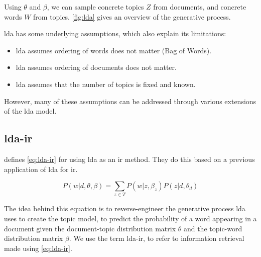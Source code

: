 Using $\theta$ and $\beta$, we can sample concrete topics $Z$ from documents, and concrete words $W$ from topics.
\autoref{fig:lda} gives an overview of the generative process.

\Gls{lda} has some underlying assumptions, which also explain its limitations\cite{blei2012topicmodels}:
\begin{itemize}
	\item \gls{lda} assumes ordering of words does not matter (Bag of Words).
	\item \gls{lda} assumes ordering of documents does not matter.
	\item \gls{lda} assumes that the number of topics is fixed and known.
\end{itemize}
However, many of these assumptions can be addressed through various extensions of the \gls{lda} model\cite{blei2012topicmodels}.

\subsection{\gls{lda}-\gls{ir}}
\citeauthor{yang2009topic}\cite{yang2009topic} defines \autoref{eq:lda-ir} for using \gls{lda} as an \gls{ir} method. 
They do this based on a previous application of \gls{lda} for \gls{ir}\cite{lda-ir}.

\begin{equation}\label{eq:lda-ir}
	P(w|d, \theta, \beta) = \sum_{z \in T} P(w|z,\beta_z) P(z|d,\theta_d)
\end{equation}

The idea behind this equation is to reverse-engineer the generative process \gls{lda} uses to create the topic model, to predict the probability of a word appearing in a document given the document-topic distribution matrix $\theta$ and the topic-word distribution matrix $\beta$.
We use the term \gls{lda}-\gls{ir}, to refer to information retrieval made using \autoref{eq:lda-ir}.
